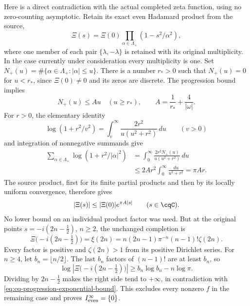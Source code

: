 Here is a direct contradiction with the actual completed zeta
function, using no zero-counting asymptotic. Retain its exact
even Hadamard product from the source,
\[
 \Xi(s)=\Xi(0)\prod_{\alpha\in\Lambda_+}
                    (1-s^2/\alpha^2),
\]
where one member of each pair $\{\lambda,-\lambda\}$ is
retained with its original multiplicity. In the case currently
under consideration every multiplicity is one.
Set $N_+(u)=\#\{\alpha\in\Lambda_+:|\alpha|\leq u\}$.
There is a number $r_*>0$ such that $N_+(u)=0$ for $u<r_*$,
since $\Xi(0)\ne0$ and its zeros are discrete.
The progression bound implies
\[
 N_+(u)\leq Au\quad(u\geq r_*),\qquad
 A=\frac1{r_*}+\frac4{|\omega|}.
\]
For $r>0$, the elementary identity
\[
 \log(1+r^2/v^2)
   =\int_v^\infty\frac{2r^2}{u(u^2+r^2)}\,du
 \qquad(v>0)
\]
and integration of nonnegative summands give
\[
 \begin{aligned}
 \sum_{\alpha\in\Lambda_+}\log(1+r^2/|\alpha|^2)
 &=\int_0^\infty\frac{2r^2N_+(u)}{u(u^2+r^2)}\,du\\
 &\leq2Ar^2\int_0^\infty\frac{du}{u^2+r^2}
 =\pi Ar .
 \end{aligned}
\]
The source product, first for its finite partial products and
then by its locally uniform convergence, therefore gives
\begin{equation}\label{eq:cq-progression-exponential-bound}
 |\Xi(s)|\leq|\Xi(0)|e^{\pi A|s|}\qquad(s\in\cqC).
\end{equation}
No lower bound on an individual product factor was used.
But at the original points $s=-i(2n-\tfrac12)$, $n\geq2$,
the unchanged completion is
\[
 \Xi\bigl(-i(2n-\tfrac12)\bigr)
 =\xi(2n)
 =n(2n-1)\pi^{-n}(n-1)!\zeta(2n).
\]
Every factor is positive and $\zeta(2n)>1$ from its positive
Dirichlet series. For $n\geq4$, let $b_n=\lfloor n/2\rfloor$.
The last $b_n$ factors of $(n-1)!$ are at least $b_n$, so
\[
 \log\left|\Xi\bigl(-i(2n-\tfrac12)\bigr)\right|
 \geq b_n\log b_n-n\log\pi .
\]
Dividing by $2n-\tfrac12$ makes the right side tend to
$+\infty$, in contradiction with
\eqref{eq:cq-progression-exponential-bound}.
This excludes every nonzero $f$ in the remaining case and
proves $I_{\rm even}^{\infty}=\{0\}$.

